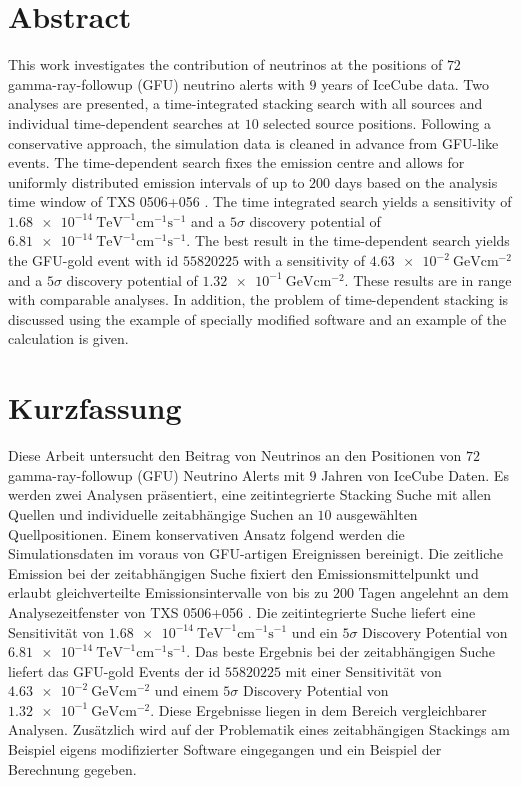 \section*{Abstract}

This work investigates the contribution of neutrinos at the positions of $\num{72}$ gamma-ray-followup (GFU) neutrino alerts with $\num{9}$ years of IceCube data.
Two analyses are presented, a time-integrated stacking search with all sources and individual time-dependent searches at $\num{10}$ selected source positions.
Following a conservative approach, the simulation data is cleaned in advance from GFU-like events.
The time-dependent search fixes the emission centre and allows for uniformly distributed emission intervals of up to $\num{200}$ days based on the analysis time window of TXS 0506+056 \cite{txs}.
The time integrated search yields a sensitivity of $\SI{1.68e-14}{\tera\electronvolt\tothe{-1}\centi\meter\tothe{-1}\second\tothe{-1}}$ and a $\num{5}\sigma$ discovery potential of $\SI{6.81e-14}{\tera\electronvolt\tothe{-1}\centi\meter\tothe{-1}\second\tothe{-1}}$.
The best result in the time-dependent search yields the GFU-gold event with id $\num{55820225}$ with a sensitivity of $\SI{4.63e-2}{\giga\electronvolt\centi\meter\tothe{-2}}$ and a $\num{5}\sigma$ discovery potential of $\SI{1.32e-1}{\giga\electronvolt\centi\meter\tothe{-2}}$.
These results are in range with comparable analyses.
In addition, the problem of time-dependent stacking is discussed using the example of specially modified software and an example of the calculation is given.

\section*{Kurzfassung}

Diese Arbeit untersucht den Beitrag von Neutrinos an den Positionen von $\num{72}$ gamma-ray-followup (GFU) Neutrino Alerts mit $\num{9}$ Jahren von IceCube Daten.
Es werden zwei Analysen präsentiert, eine zeitintegrierte Stacking Suche mit allen Quellen und individuelle zeitabhängige Suchen an $\num{10}$ ausgewählten Quellpositionen.
Einem konservativen Ansatz folgend werden die Simulationsdaten im voraus von GFU-artigen Ereignissen bereinigt.
Die zeitliche Emission bei der zeitabhängigen Suche fixiert den Emissionsmittelpunkt und erlaubt gleichverteilte Emissionsintervalle von bis zu $\num{200}$ Tagen angelehnt an dem Analysezeitfenster von TXS 0506+056 \cite{txs}.
Die zeitintegrierte Suche liefert eine Sensitivität von $\SI{1.68e-14}{\tera\electronvolt\tothe{-1}\centi\meter\tothe{-1}\second\tothe{-1}}$ und ein $\num{5}\sigma$ Discovery Potential von $\SI{6.81e-14}{\tera\electronvolt\tothe{-1}\centi\meter\tothe{-1}\second\tothe{-1}}$.
Das beste Ergebnis bei der zeitabhängigen Suche liefert das GFU-gold Events der id $\num{55820225}$ mit einer Sensitivität von $\SI{4.63e-2}{\giga\electronvolt\centi\meter\tothe{-2}}$ und einem $\num{5}\sigma$ Discovery Potential von $\SI{1.32e-1}{\giga\electronvolt\centi\meter\tothe{-2}}$.
Diese Ergebnisse liegen in dem Bereich vergleichbarer Analysen.
Zusätzlich wird auf der Problematik eines zeitabhängigen Stackings am Beispiel eigens modifizierter Software eingegangen und ein Beispiel der Berechnung gegeben.
